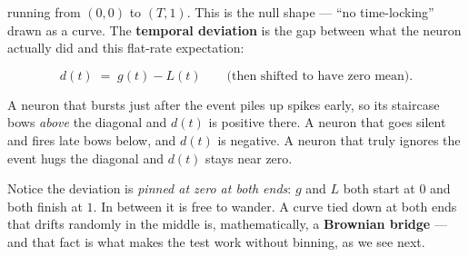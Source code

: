 \documentclass[11pt]{article}
\begin{document}
running from $(0,0)$ to $(T,1)$. This is the null shape --- ``no time-locking''
drawn as a curve. The \textbf{temporal deviation} is the gap between what the
neuron actually did and this flat-rate expectation:

\[
  d(t) \;=\; g(t) - L(t)
  \qquad\text{(then shifted to have zero mean).}
\]

A neuron that bursts just after the event piles up spikes early, so its
staircase bows \emph{above} the diagonal and $d(t)$ is positive there. A neuron
that goes silent and fires late bows below, and $d(t)$ is negative. A neuron
that truly ignores the event hugs the diagonal and $d(t)$ stays near zero.

\begin{center}
\end{center}

\noindent
Notice the deviation is \emph{pinned at zero at both ends}: $g$ and $L$ both
start at $0$ and both finish at $1$. In between it is free to wander. A curve
tied down at both ends that drifts randomly in the middle is, mathematically, a
\textbf{Brownian bridge} --- and that fact is what makes the test work without
binning, as we see next.

\end{document}
